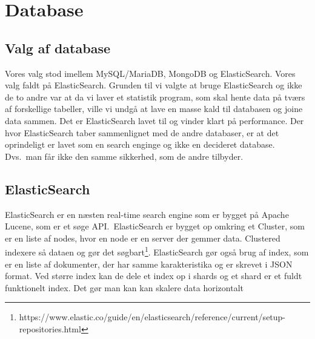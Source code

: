 \section{Database}
\subsection{Valg af database}
Vores valg stod imellem MySQL/MariaDB, MongoDB og ElasticSearch. Vores valg faldt på ElasticSearch. Grunden til vi valgte at bruge ElasticSearch og ikke de to andre var at da vi laver et statistik program, som skal hente data på tværs af forskellige tabeller, ville vi undgå at lave en masse kald til databasen og joine data sammen. Det er ElasticSearch lavet til og vinder klart på performance. 
Der hvor ElasticSearch taber sammenlignet med de andre databaser, er at det oprindeligt er lavet som en search enginge og ikke en decideret database. Dvs.\ man får ikke den samme sikkerhed, som de andre tilbyder. 
\subsection{ElasticSearch}
ElasticSearch er en næsten real-time search engine som er bygget på Apache Lucene, som er et søge API.\
ElasticSearch er bygget op omkring et Cluster, som er en liste af nodes, hvor en node er en server der gemmer data. Clustered indexere så dataen og gør det søgbart\footnote{https://www.elastic.co/guide/en/elasticsearch/reference/current/setup-repositories.html}.
ElasticSearch gør også brug af index, som er en liste af dokumenter, der har samme karakteristika og er skrevet i JSON format. Ved større index kan de dele et index op i shards og et shard er et fuldt funktionelt index. Det gør man kan kan skalere data horizontalt
